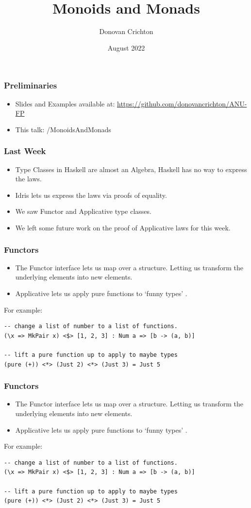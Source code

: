 \documentclass[hyperref={colorlinks = true,linkcolor = blue, citecolor = blue, urlcolor = blue}]{beamer}
\title{Monoids and Monads}
\author{Donovan Crichton}
\date{August 2022}
\begin{document}
 
\frame{\titlepage}

\begin{frame}[fragile]
  \frametitle{Preliminaries}
  \begin{itemize}
  \item Slides and Examples available at:
    \url{https://github.com/donovancrichton/ANU-FP}
  \item This talk: /MonoidsAndMonads
  \end{itemize}
\end{frame}

\begin{frame}[fragile]
  \frametitle{Last Week}
  \begin{itemize}
    \item Type Classes in Haskell are almost an Algebra, Haskell has no way to express the laws.
    \item Idris lets us express the laws via proofs of equality.
    \item We saw Functor and Applicative type classes.
    \item We left some future work on the proof of Applicative laws for this week.
  \end{itemize}
\end{frame}

\begin{frame}[fragile]
  \frametitle{Functors}
  \begin{itemize}
    \item The Functor interface lets us map over a structure. Letting us transform the underlying elements into new elements.
    \item Applicative lets us apply pure functions to `funny types' \citep{mcbride2008applicative}.
  \end{itemize}
  For example:
  \begin{verbatim}
-- change a list of number to a list of functions.
(\x => MkPair x) <$> [1, 2, 3] : Num a => [b -> (a, b)]

-- lift a pure function up to apply to maybe types
(pure (+)) <*> (Just 2) <*> (Just 3) = Just 5
  \end{verbatim}
\end{frame}

\begin{frame}[fragile]
  \frametitle{Functors}
  \begin{itemize}
    \item The Functor interface lets us map over a structure. Letting us transform the underlying elements into new elements.
    \item Applicative lets us apply pure functions to `funny types' \citep{mcbride2008applicative}.
  \end{itemize}
  For example:
  \begin{verbatim}
-- change a list of number to a list of functions.
(\x => MkPair x) <$> [1, 2, 3] : Num a => [b -> (a, b)]

-- lift a pure function up to apply to maybe types
(pure (+)) <*> (Just 2) <*> (Just 3) = Just 5
  \end{verbatim}
\end{frame}
\end{document}
